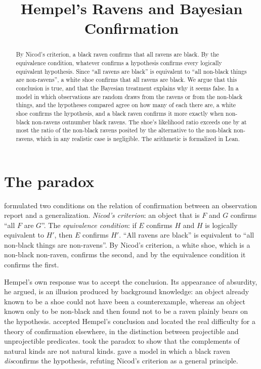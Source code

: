 \documentclass{situationist-preprint}
\title{Hempel's Ravens and Bayesian Confirmation}
\begin{document}
\maketitle

\begin{abstract}
By Nicod's criterion, a black raven confirms that all ravens are black. By the equivalence condition, whatever confirms a hypothesis confirms every logically equivalent hypothesis. Since \enquote{all ravens are black} is equivalent to \enquote{all non-black things are non-ravens}, a white shoe confirms that all ravens are black. We argue that this conclusion is true, and that the Bayesian treatment explains why it seems false. In a model in which observations are random draws from the ravens or from the non-black things, and the hypotheses compared agree on how many of each there are, a white shoe confirms the hypothesis, and a black raven confirms it more exactly when non-black non-ravens outnumber black ravens. The shoe's likelihood ratio exceeds one by at most the ratio of the non-black ravens posited by the alternative to the non-black non-ravens, which in any realistic case is negligible. The arithmetic is formalized in Lean.
\end{abstract}

\section{The paradox}

\citet{Hempel1945} formulated two conditions on the relation of confirmation between an observation report and a generalization. \emph{Nicod's criterion}: an object that is $F$ and $G$ confirms \enquote{all $F$ are $G$}. The \emph{equivalence condition}: if $E$ confirms $H$ and $H$ is logically equivalent to $H'$, then $E$ confirms $H'$. \enquote{All ravens are black} is equivalent to \enquote{all non-black things are non-ravens}. By Nicod's criterion, a white shoe, which is a non-black non-raven, confirms the second, and by the equivalence condition it confirms the first.

Hempel's own response was to accept the conclusion. Its appearance of absurdity, he argued, is an illusion produced by background knowledge: an object already known to be a shoe could not have been a counterexample, whereas an object known only to be non-black and then found not to be a raven plainly bears on the hypothesis. \citet{Goodman1955} accepted Hempel's conclusion and located the real difficulty for a theory of confirmation elsewhere, in the distinction between projectible and unprojectible predicates. \citet{Quine1969} took the paradox to show that the complements of natural kinds are not natural kinds. \citet{Good1967} gave a model in which a black raven \emph{dis}confirms the hypothesis, refuting Nicod's criterion as a general principle.
\end{document}

